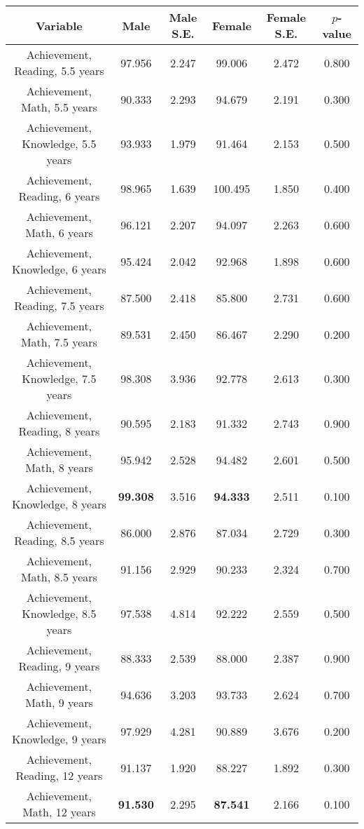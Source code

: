 \begin{longtable}{c c c c c c}
\toprule
\textbf{Variable} & \textbf{Male} & \textbf{Male S.E.}  & \textbf{Female} & \textbf{Female S.E.} & \textbf{$ p $-value} \\
\midrule
Achievement, Reading, 5.5 years & 97.956 & 2.247 &  99.006 & 2.472 & 0.800 \\
Achievement, Math, 5.5 years & 90.333 & 2.293 &  94.679 & 2.191 & 0.300 \\
Achievement, Knowledge, 5.5 years & 93.933 & 1.979 &  91.464 & 2.153 & 0.500 \\
Achievement, Reading, 6 years & 98.965 & 1.639 &  100.495 & 1.850 & 0.400 \\
Achievement, Math, 6 years & 96.121 & 2.207 &  94.097 & 2.263 & 0.600 \\
Achievement, Knowledge, 6 years & 95.424 & 2.042 &  92.968 & 1.898 & 0.600 \\
Achievement, Reading, 7.5 years & 87.500 & 2.418 &  85.800 & 2.731 & 0.600 \\
Achievement, Math, 7.5 years & 89.531 & 2.450 &  86.467 & 2.290 & 0.200 \\
Achievement, Knowledge, 7.5 years & 98.308 & 3.936 &  92.778 & 2.613 & 0.300 \\
Achievement, Reading, 8 years & 90.595 & 2.183 &  91.332 & 2.743 & 0.900 \\
Achievement, Math, 8 years & 95.942 & 2.528 &  94.482 & 2.601 & 0.500 \\
Achievement, Knowledge, 8 years & \textbf{99.308} & 3.516 &  \textbf{94.333} & 2.511 & 0.100 \\
Achievement, Reading, 8.5 years & 86.000 & 2.876 &  87.034 & 2.729 & 0.300 \\
Achievement, Math, 8.5 years & 91.156 & 2.929 &  90.233 & 2.324 & 0.700 \\
Achievement, Knowledge, 8.5 years & 97.538 & 4.814 &  92.222 & 2.559 & 0.500 \\
Achievement, Reading, 9 years & 88.333 & 2.539 &  88.000 & 2.387 & 0.900 \\
Achievement, Math, 9 years & 94.636 & 3.203 &  93.733 & 2.624 & 0.700 \\
Achievement, Knowledge, 9 years & 97.929 & 4.281 &  90.889 & 3.676 & 0.200 \\
Achievement, Reading, 12 years & 91.137 & 1.920 &  88.227 & 1.892 & 0.300 \\
Achievement, Math, 12 years & \textbf{91.530} & 2.295 &  \textbf{87.541} & 2.166 & 0.100 \\

\end{longtable}
